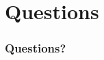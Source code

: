 \documentclass{beamer}
\begin{document}
	\section{Questions}
	\begin{frame}
		\frametitle{Questions?}
	\end{frame}	
\end{document}
